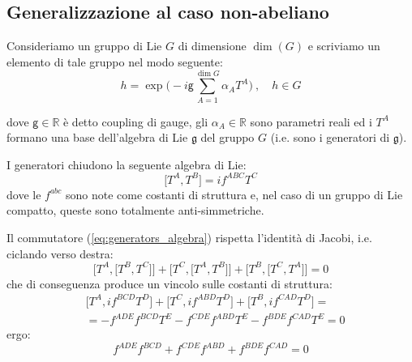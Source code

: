 \documentclass[../main.tex]{subfiles}
\begin{document}
\subsection{Generalizzazione al caso non-abeliano}
Consideriamo un gruppo di Lie $G$ di dimensione $\dim(G)$ e scriviamo un elemento di tale gruppo nel modo seguente:
\begin{equation}
    \boxed{h = \exp\bigg(-i\mathsf{g}\sum_{A=1}^{\dim G}\alpha_AT^A\bigg)~,\quad h\in G}
    \label{eq:generic_group_element}
\end{equation}

dove $\mathsf{g}\in\mathbb R$ è detto coupling di gauge, gli $\alpha_A\in\mathbb R$ sono parametri reali ed i $T^A$ formano una base dell'algebra di Lie $\mathfrak{g}$ del gruppo $G$ (i.e. sono i generatori di $\mathfrak{g}$).

I generatori chiudono la seguente algebra di Lie:
\begin{equation}
    \big[T^A,T^B\big] = i f^{ABC}T^C
    \label{eq:generators_algebra}
\end{equation}
dove le $f^{abc}$ sono note come costanti di struttura e, nel caso di un gruppo di Lie compatto, queste sono totalmente anti-simmetriche.

Il commutatore (\ref{eq:generators_algebra}) rispetta l'identità di Jacobi, i.e. ciclando verso destra:
\begin{equation}
    \big[T^A, \big[T^B,T^C\big]\big] + \big[T^C, \big[T^A,T^B\big]\big] + \big[T^B, \big[T^C,T^A\big]\big] = 0
    \label{eq:commutator_jacobi}
\end{equation}
che di conseguenza produce un vincolo sulle costanti di struttura:
\begin{align*}
    &\big[T^A, i f^{BCD}T^D\big] + \big[T^C, i f^{ABD}T^D\big] + \big[T^B, i f^{CAD}T^D\big] = \\
    &= - f^{ADE}f^{BCD}T^E - f^{CDE}f^{ABD}T^E - f^{BDE}f^{CAD}T^E = 0
\end{align*}
ergo:
\begin{equation}
    \boxed{f^{ADE}f^{BCD} + f^{CDE}f^{ABD} + f^{BDE}f^{CAD} = 0}
    \label{eq:struct_const_constraint_jacobi}
\end{equation}
\end{document}
